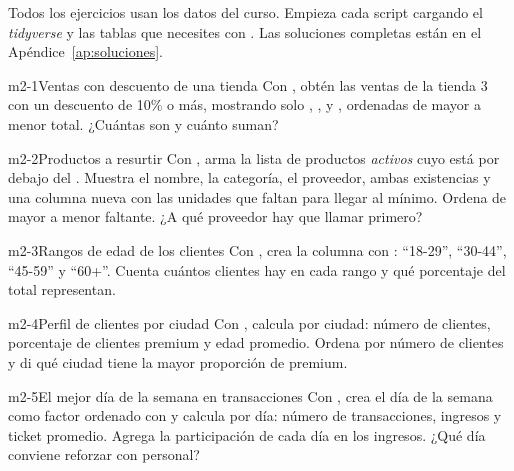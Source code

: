 Todos los ejercicios usan los datos del curso. Empieza cada script cargando
el \emph{tidyverse} y las tablas que necesites con .
Las soluciones completas están en el Apéndice~\ref{ap:soluciones}.

\begin{ejercicio}{m2-1}{Ventas con descuento de una tienda}
Con , obtén las ventas de la tienda 3 con un
descuento de 10\% o más, mostrando solo ,
,  y , ordenadas de
mayor a menor total. ¿Cuántas son y cuánto suman?
\end{ejercicio}

\begin{ejercicio}{m2-2}{Productos a resurtir}
Con , arma la lista de productos \emph{activos} cuyo
 está por debajo del . Muestra el
nombre, la categoría, el proveedor, ambas existencias y una columna nueva
 con las unidades que faltan para llegar al mínimo. Ordena
de mayor a menor faltante. ¿A qué proveedor hay que llamar primero?
\end{ejercicio}

\begin{ejercicio}{m2-3}{Rangos de edad de los clientes}
Con , crea la columna  con
: ``18-29'', ``30-44'', ``45-59'' y ``60+''. Cuenta
cuántos clientes hay en cada rango y qué porcentaje del total representan.
\end{ejercicio}

\begin{ejercicio}{m2-4}{Perfil de clientes por ciudad}
Con , calcula por ciudad: número de clientes,
porcentaje de clientes premium y edad promedio. Ordena por número de
clientes y di qué ciudad tiene la mayor proporción de premium.
\end{ejercicio}

\begin{ejercicio}{m2-5}{El mejor día de la semana en transacciones}
Con , crea el día de la semana como factor
ordenado con  y calcula por
día: número de transacciones, ingresos y ticket promedio. Agrega la
participación de cada día en los ingresos. ¿Qué día conviene reforzar con
personal?
\end{ejercicio}

